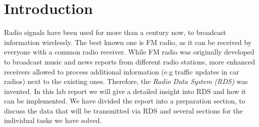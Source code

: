 \documentclass[sigconf]{acmart}
\begin{document}
%
%





\maketitle

\section{Introduction}

Radio signals have been used for more than a century now, to broadcast
information wirelessly. The best known one is FM radio, as it can be
received by everyone with a common radio receiver. While FM radio was
originally developed to broadcast music and news reports from different
radio stations, more enhanced receivers allowed to process additional
information (e.g traffic updates in car radios) next to the existing
ones. Therefore, the \emph{Radio Data System (RDS)} was invented. 
In this lab report we will give a detailed insight into RDS and how it can be
implemented. We have divided the report into a preparation section, to discuss the
data that will be transmitted via RDS and several sections for the individual tasks we have solved. 
\end{document}
